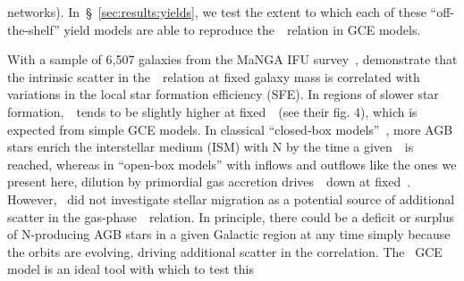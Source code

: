 \documentclass[ms.tex]{subfiles}
\begin{document}
networks).
In~\S~\ref{sec:results:yields}, we test the extent to which each of these
``off-the-shelf'' yield models are able to reproduce the~\ohno~relation in
GCE models.
\par
With a sample of 6,507 galaxies from the MaNGA IFU survey~\citep{Bundy2015},
\citet{Schaefer2020} demonstrate that the intrinsic scatter in
the~\ohno~relation at fixed galaxy mass is correlated with variations in the
local star formation efficiency (SFE).
In regions of slower star formation,~\no~tends to be slightly higher at
fixed~\oh~(see their fig. 4), which is expected from simple GCE models.
In classical ``closed-box models''~\citep[e.g.][]{Molla2006}, more AGB stars
enrich the interstellar medium (ISM) with N by the time a given~\oh~is reached,
whereas in ``open-box models'' with inflows and outflows like the ones we
present here, dilution by primordial gas accretion drives~\oh~down at fixed~\no.
However,~\citet{Schaefer2020} did not investigate stellar migration as a
potential source of additional scatter in the gas-phase~\ohno~relation.
In principle, there could be a deficit or surplus of N-producing AGB stars in a
given Galactic region at any time simply because the orbits are evolving,
driving additional scatter in the correlation.
The~\citet{Johnson2021} GCE model is an ideal tool with which to test this
\end{document}
